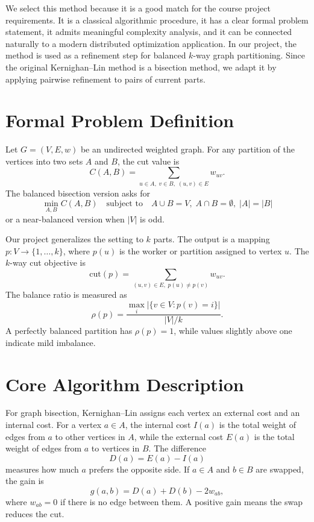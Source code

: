 \documentclass[11pt]{article}
\begin{document}
We select this method because it is a good match for the course project
requirements. It is a classical algorithmic procedure, it has a clear formal
problem statement, it admits meaningful complexity analysis, and it can be
connected naturally to a modern distributed optimization application. In our
project, the method is used as a refinement step for balanced $k$-way graph
partitioning. Since the original Kernighan--Lin method is a bisection method,
we adapt it by applying pairwise refinement to pairs of current parts.

\section{Formal Problem Definition}

Let $G=(V,E,w)$ be an undirected weighted graph. For any partition of the
vertices into two sets $A$ and $B$, the cut value is
\[
    C(A,B) = \sum_{u\in A,\;v\in B,\;(u,v)\in E} w_{uv}.
\]
The balanced bisection version asks for
\[
    \min_{A,B} C(A,B)
    \quad
    \text{subject to}
    \quad
    A\cup B=V,\; A\cap B=\emptyset,\; |A|=|B|
\]
or a near-balanced version when $|V|$ is odd.

Our project generalizes the setting to $k$ parts. The output is a mapping
$p:V\to\{1,\ldots,k\}$, where $p(u)$ is the worker or partition assigned to
vertex $u$. The $k$-way cut objective is
\[
    \mathrm{cut}(p)
    =
    \sum_{(u,v)\in E,\; p(u)\neq p(v)} w_{uv}.
\]
The balance ratio is measured as
\[
    \rho(p)
    =
    \frac{\max_i |\{v\in V:p(v)=i\}|}{|V|/k}.
\]
A perfectly balanced partition has $\rho(p)=1$, while values slightly above
one indicate mild imbalance.

\section{Core Algorithm Description}

For graph bisection, Kernighan--Lin assigns each vertex an external cost and
an internal cost. For a vertex $a\in A$, the internal cost $I(a)$ is the total
weight of edges from $a$ to other vertices in $A$, while the external cost
$E(a)$ is the total weight of edges from $a$ to vertices in $B$. The difference
\[
    D(a) = E(a) - I(a)
\]
measures how much $a$ prefers the opposite side. If $a\in A$ and $b\in B$ are
swapped, the gain is
\[
    g(a,b) = D(a) + D(b) - 2w_{ab},
\]
where $w_{ab}=0$ if there is no edge between them. A positive gain means the
swap reduces the cut.
\end{document}
